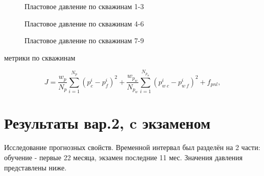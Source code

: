 \documentclass[14pt]{article}
\begin{document}
	\begin{figure}
		\caption{Пластовое давление по скважинам 1-3}
		\label{fig:2.1_3}
	\end{figure}
	
	\begin{figure}
		\caption{Пластовое давление по скважинам 4-6}
		\label{fig:2.4_6}
	\end{figure}
	
	\begin{figure}
		\caption{Пластовое давление по скважинам 7-9}
		\label{fig:2.7_9}
	\end{figure}
	метрики по скважинам
	
\begin{equation} \label{mse}
	J=\frac{w_p}{N_p}\sum_{i=1}^{N_p}{\left(p_c^i-p_f^i\right)^2}+
	\frac{w_{p_w}}{N_{p_w}}\sum_{i=1}^{N_{p_w}}{\left(p_{w\:c}^i-p_{w\:f}^i\right)^2} + f_{pnl},
\end{equation}

	\section{Результаты вар.2, c экзаменом}
	Исследование прогнозных свойств. Временной интервал был разделён на 2 части: обучение - первые 22 месяца, экзамен последние 11 мес. Значения давления представлены ниже.
		
\end{document}

